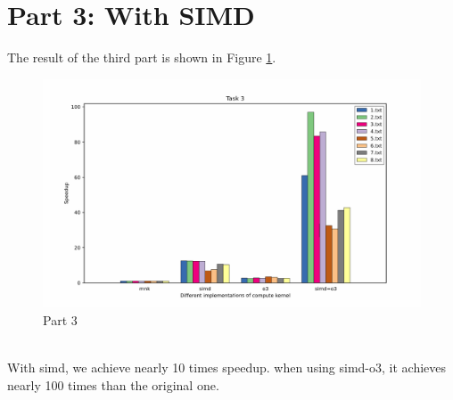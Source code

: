 \documentclass[]{article}
\begin{document}
\section*{Part 3: With SIMD}
The result of the third part is shown in Figure \ref{fig:part3}.
\begin{figure}[h]
		\centering
		\includegraphics[width=1.0\textwidth]{task3.png}
		\caption{Part 3}
		\label{fig:part3}
\end{figure}
\\
With simd, we achieve nearly 10 times speedup. when using simd-o3, it achieves nearly 100 times than the original one.
\end{document}
